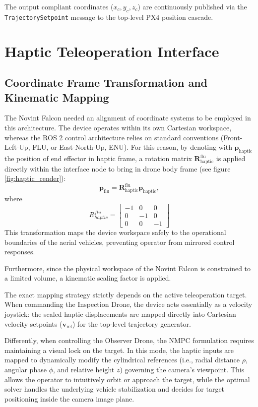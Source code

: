 The output compliant coordinates ($x_c, y_c, z_c$) are continuously published via the \texttt{TrajectorySetpoint} message to the top-level PX4 position cascade.

\section{Haptic Teleoperation Interface}
\subsection{Coordinate Frame Transformation and Kinematic Mapping}
The Novint Falcon needed an alignment of coordinate systems to be employed in this architecture. The device operates within its own Cartesian workspace, whereas the ROS 2 control architecture relies on standard conventions (Front-Left-Up, FLU, or East-North-Up, ENU). 
For this reason, by denoting with $\mathbf{p}_\text{haptic}$ the position of end effector in haptic frame, a rotation matrix $\mathbf{R}_{\text{haptic}}^{\text{flu}}$ is applied directly within the interface node to bring in drone body frame (see figure \ref{fig:haptic_render}):
\begin{equation*}
    \mathbf{p}_{\text{flu}} = \mathbf{R}_{\text{haptic}}^{\text{flu}} \mathbf{p}_{\text{haptic}},    
\end{equation*}
where
\begin{equation*}
     R_{haptic}^{flu}=\begin{bmatrix}
    -1 & 0 & 0 \\ 0 & -1 & 0 \\ 0 & 0 & -1
\end{bmatrix}
\end{equation*}
This transformation maps the device workspace safely to the operational boundaries of the aerial vehicles, preventing operator from mirrored control responses.

\noindent Furthermore, since the physical workspace of the Novint Falcon is constrained to a limited volume, a kinematic scaling factor is applied.

\noindent The exact mapping strategy strictly depends on the active teleoperation target. When commanding the Inspection Drone, the device acts essentially as a velocity joystick: the scaled haptic displacements are mapped directly into Cartesian velocity setpoints ($\mathbf{v}_{\text{ref}}$) for the top-level trajectory generator. 

\noindent Differently, when controlling the Observer Drone, the NMPC formulation requires maintaining a visual lock on the target. In this mode, the haptic inputs are mapped to dynamically modify the cylindrical references (i.e., radial distance $\rho$, angular phase $\phi$, and relative height $z$) governing the camera's viewpoint. This allows the operator to intuitively orbit or approach the target, while the optimal solver handles the underlying vehicle stabilization and decides for target positioning inside the camera image plane.

